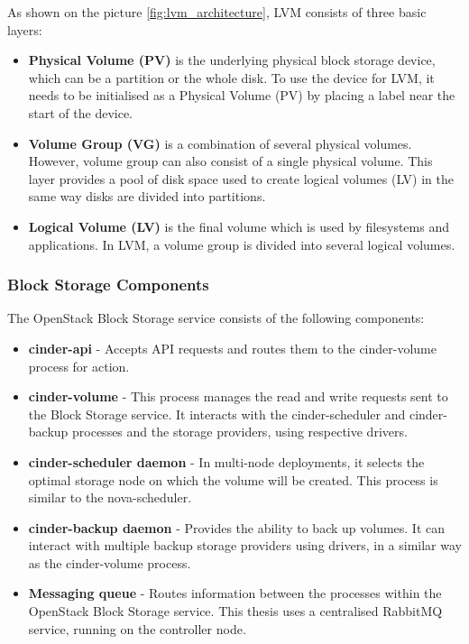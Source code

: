 As shown on the picture \ref{fig:lvm_architecture}, LVM consists of three basic layers:
\begin{itemize}
\item{\textbf{Physical Volume (PV)} is the underlying physical block storage device, which can be a partition or the whole disk. To use the device for LVM, it needs to be initialised as a Physical Volume (PV) by placing a label near the start of the device.}
\item{\textbf{Volume Group (VG)} is a combination of several physical volumes. However, volume group can also consist of a single physical volume. This layer provides a pool of disk space used to create logical volumes (LV) in the same way disks are divided into partitions.}
\item{\textbf{Logical Volume (LV)} is the final volume which is used by filesystems and applications. In LVM, a volume group is divided into several logical volumes.}
\end{itemize}

\subsubsection*{Block Storage Components}

The OpenStack Block Storage service consists of the following components:
\begin{itemize}
\item{\textbf{cinder-api} - Accepts API requests and routes them to the cinder-volume process for action.}
\item{\textbf{cinder-volume} - This process manages the read and write requests sent to the Block Storage service. It interacts with the cinder-scheduler and cinder-backup processes and the storage providers, using respective drivers.}
\item{\textbf{cinder-scheduler daemon} - In multi-node deployments, it selects the optimal storage node on which the volume will be created. This process is similar to the nova-scheduler.}
\item{\textbf{cinder-backup daemon} - Provides the ability to back up volumes. It can interact with multiple backup storage providers using drivers, in a similar way as the cinder-volume process.}
\item{\textbf{Messaging queue} - Routes information between the processes within the OpenStack Block Storage service. This thesis uses a centralised RabbitMQ service, running on the controller node.}
\\\cite{InstallGuide}
\end{itemize}





